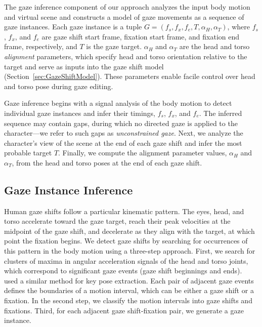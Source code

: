 The gaze inference component of our approach analyzes the input body motion and virtual scene and constructs a model of gaze movements as a sequence of gaze instances. Each gaze instance is a tuple $G = (f_s, f_x, f_e, T, \alpha_{H}, \alpha_{T})$, where $f_s$, $f_x$, and $f_e$ are gaze shift start frame, fixation start frame, and fixation end frame, respectively, and $T$ is the gaze target. $\alpha_{H}$ and $\alpha_{T}$ are the head and  torso \emph{alignment} parameters, which specify head and torso orientation relative to the target and serve as inputs into the gaze shift model (Section~\ref{sec:GazeShiftModel}). These parameters enable facile control over head and torso pose during gaze editing.

Gaze inference begins with a signal analysis of the body motion to detect individual gaze instances and infer their timings, $f_s$, $f_x$, and $f_e$. The inferred sequence may contain gaps, during which no directed gaze is applied to the character---we refer to such gaps as \emph{unconstrained gaze}. Next, we analyze the character's view of the scene at the end of each gaze shift and infer the most probable target $T$. Finally, we compute the alignment parameter values, $\alpha_{H}$ and $\alpha_{T}$, from the head and torso poses at the end of each gaze shift.

\subsection{Gaze Instance Inference}
\label{sec:GazeTimingInference}

Human gaze shifts follow a particular kinematic pattern. The eyes, head, and torso accelerate toward the gaze target, reach their peak velocities at the midpoint of the gaze shift, and decelerate as they align with the target, at which point the fixation begins. We detect gaze shifts by searching for occurrences of this pattern in the body motion using a three-step approach. First, we search for clusters of maxima in angular acceleration signals of the head and torso joints, which correspond to significant gaze events (gaze shift beginnings and ends).~\citet{coleman2008staggered} used a similar method for key pose extraction. Each pair of adjacent gaze events defines the boundaries of a motion interval, which can be either a gaze shift or a fixation. In the second step, we classify the motion intervals into gaze shifts and fixations. Third, for each adjacent gaze shift-fixation pair, we generate a gaze instance.

